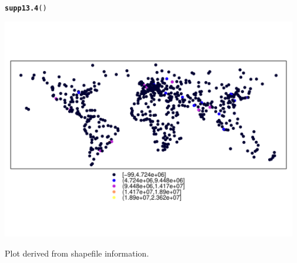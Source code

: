 \documentclass[12pt, a4paper,  BCOR=8.25mm, DIV=15]{scrartcl}\usepackage[]{graphicx}\usepackage[]{color}
\makeatletter
\newcommand{\hlstd}[1]{\textcolor[rgb]{0.345,0.345,0.345}{#1}}%
\newcommand{\hlkwd}[1]{\textcolor[rgb]{0.737,0.353,0.396}{\textbf{#1}}}%
\newenvironment{kframe}{%
 \def\at@end@of@kframe{}%
 \ifinner\ifhmode%
  \def\at@end@of@kframe{\end{minipage}}%
  \begin{minipage}{\columnwidth}%
 \fi\fi%
 \def\FrameCommand##1{\hskip\@totalleftmargin \hskip-\fboxsep
 \colorbox{shadecolor}{##1}\hskip-\fboxsep
     \hskip-\linewidth \hskip-\@totalleftmargin \hskip\columnwidth}%
 \MakeFramed {\advance\hsize-\width
   \@totalleftmargin\z@ \linewidth\hsize
   \@setminipage}}%
 {\par\unskip\endMakeFramed%
 \at@end@of@kframe}
\newenvironment{knitrout}{}{} %
\makeatother
\begin{document}
\begin{suppfigure}
\begin{knitrout}
\color{fgcolor}\begin{kframe}
\begin{alltt}
\hlkwd{supp13.4}\hlstd{()}
\end{alltt}
\end{kframe}

{\centering \includegraphics[width=0.97\textwidth]{figs/map-shape-supp13_4-1} 

}



\end{knitrout}
\caption{Plot derived from shapefile information.}
\end{suppfigure}
\end{document}
